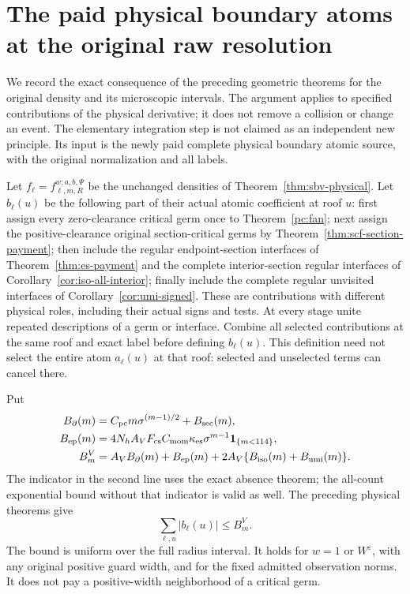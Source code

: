 \section{The paid physical boundary atoms at the original raw resolution}
\label{sec:pa-raw}

We record the exact consequence of the preceding geometric
theorems for the original density and its microscopic intervals.
The argument applies to specified contributions of the physical
derivative; it does not remove a collision or change an event.
The elementary integration step is not claimed as an independent
new principle. Its input is the newly paid complete physical
boundary atomic source, with the original normalization and all labels.

Let $f_\ell=f^{w;a,b,\Psi}_{\ell,m,R}$ be the unchanged densities
of Theorem~\ref{thm:sbv-physical}. Let $b_\ell(u)$ be the following
part of their actual atomic coefficient at roof $u$:
first assign every zero-clearance critical germ once to
Theorem~\ref{pc:fan}; next assign the positive-clearance original
section-critical germs by Theorem~\ref{thm:scf-section-payment};
then include the regular endpoint-section interfaces of
Theorem~\ref{thm:es-payment} and the complete interior-section
regular interfaces of Corollary~\ref{cor:iso-all-interior};
finally include the complete regular unvisited interfaces of
Corollary~\ref{cor:umi-signed}. These are contributions with
different physical roles, including their actual signs and tests.
At every stage unite repeated descriptions of a germ or interface.
Combine all selected contributions at the same roof and exact
label before defining $b_\ell(u)$. This definition need not select
the entire atom $a_\ell(u)$ at that roof: selected and unselected
terms can cancel there.

Put
\begin{align}
 B_\partial(m)&=C_{\rm pc}m\sigma^{(m-1)/2}+B_{\rm sec}(m),
                                                    \label{eq:pa-boundary}\\
 B_{\rm ep}(m)&=4N_h A_V F_{\rm cs}C_{\rm mom}
                   \kappa_{\rm es}\sigma^{m-1}
                         \mathbf1_{\{m<114\}},\notag\\
 B_m^V&=A_V B_\partial(m)+B_{\rm ep}(m)
                     +2A_V\{B_{\rm iso}(m)+B_{\rm umi}(m)\}.
                                                    \label{eq:pa-budget}
\end{align}
The indicator in the second line uses the exact absence theorem;
the all-count exponential bound without that indicator is valid
as well. The preceding physical theorems give
\begin{equation}\label{eq:pa-all-atoms}
                   \sum_{\ell,u}|b_\ell(u)|\le B_m^V.
\end{equation}
The bound is uniform over the full radius interval. It holds
for $w=1$ or $W^\varepsilon$, with any original positive guard
width, and for the fixed admitted observation norms. It does
not pay a positive-width neighborhood of a critical germ.

